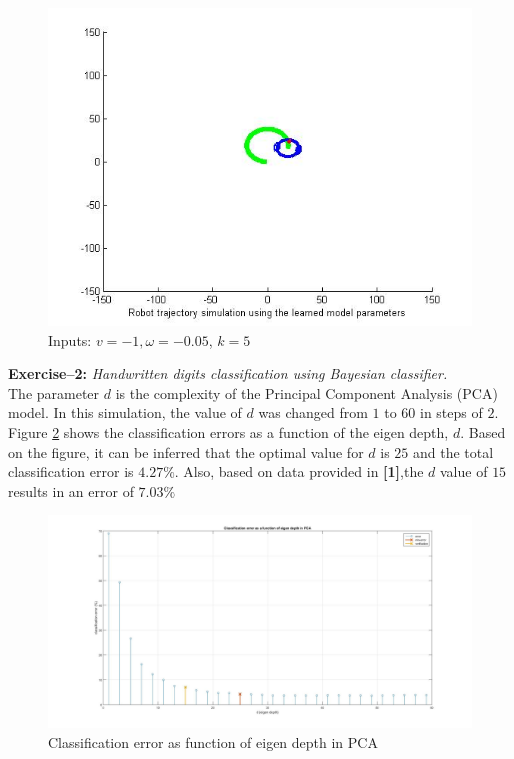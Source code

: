 \documentclass[10pt,a4paper]{report}
\begin{document}
\begin{figure}[!ht]
	\graphicspath{{./Exercise1/}}
	\centering
	\includegraphics[scale=0.5]{k_5_fig_5}	
	
	\begin{flushleft}
	\caption{Inputs: $v=-1,\omega=-0.05$, $k=5$}
	\end{flushleft}
	\label{fig:fig_10}
	
\end{figure}

\clearpage
\textbf{Exercise--2:}
\textit{Handwritten digits classification using Bayesian classifier.}\\
The parameter \textbf{$d$} is the complexity of the Principal Component Analysis (PCA) model. In this simulation, the value of \textbf{$d$} was changed from $1$ to $60$ in steps of $2$. Figure \ref{fig:fig_11} shows the classification errors as a function of the eigen depth, \textbf{$d$}. Based on the figure, it can be inferred that the optimal value for \textbf{$d$} is $25$ and the total classification error is $4.27\%$. Also, based on data provided in \textbf{[1]},the \textbf{$d$} value of $15$ results in an error of $7.03\%$ \\


\begin{figure}[!ht]
	\graphicspath{{./Exercise2/}}
	\centering
	\includegraphics[scale=0.21]{ErrorAsFunction_d}	
	
	\begin{flushleft}
	\caption{Classification error as function of eigen depth in PCA}
	\end{flushleft}
	\label{fig:fig_11}
	
\end{figure}
\end{document}
